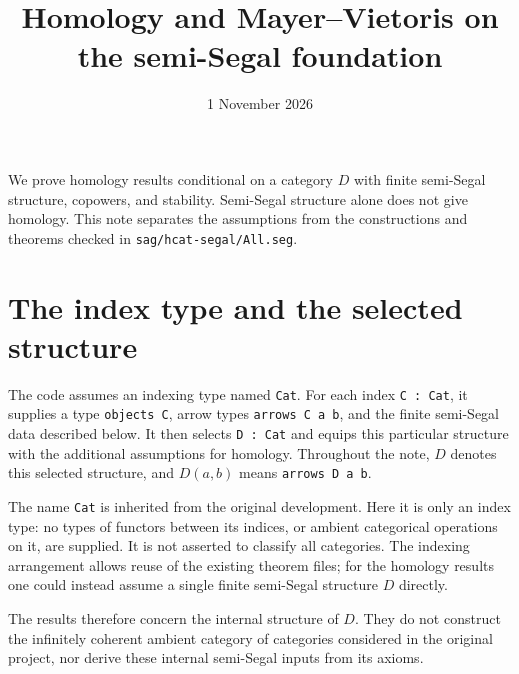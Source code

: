 \documentclass[11pt]{amsart}
\title{Homology and Mayer--Vietoris on the semi-Segal foundation}
\date{1 November 2026}
\newcommand{\code}[1]{\nolinkurl{#1}}
\begin{document}
\maketitle

We prove homology results conditional on a category $D$ with finite
semi-Segal structure, copowers, and stability. Semi-Segal structure alone
does not give homology. This note separates the assumptions from the
constructions and theorems checked in \code{sag/hcat-segal/All.seg}.

\section{The index type and the selected structure}
The code assumes an indexing type named \code{Cat}. For each index
\code{C : Cat}, it supplies a type \code{objects C}, arrow types
\code{arrows C a b}, and the finite semi-Segal data described below.
It then selects \code{D : Cat} and equips this particular structure
with the additional assumptions for homology. Throughout the note,
$D$ denotes this selected structure, and $D(a,b)$ means
\code{arrows D a b}.

The name \code{Cat} is inherited from the original development.
Here it is only an index type: no types of functors between its indices,
or ambient categorical operations on it, are supplied. It is not
asserted to classify all categories. The indexing arrangement allows
reuse of the existing theorem files; for the homology results one
could instead assume a single finite semi-Segal structure $D$ directly.

The results therefore concern the internal structure of $D$.
They do not construct the infinitely coherent ambient category of
categories considered in the original project, nor derive these
internal semi-Segal inputs from its axioms.
\end{document}
